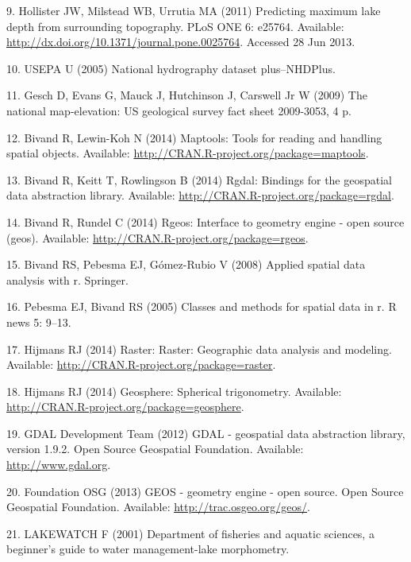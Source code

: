 \documentclass[11pt,]{article}
\begin{document}
\hypertarget{ref-hollister2011predicting}{}
9. Hollister JW, Milstead WB, Urrutia MA (2011) Predicting maximum lake
depth from surrounding topography. PLoS ONE 6: e25764. Available:
\url{http://dx.doi.org/10.1371/journal.pone.0025764}. Accessed 28 Jun
2013.

\hypertarget{ref-usepa2005national}{}
10. USEPA U (2005) National hydrography dataset plus--NHDPlus.

\hypertarget{ref-gesch2009national}{}
11. Gesch D, Evans G, Mauck J, Hutchinson J, Carswell Jr W (2009) The
national map-elevation: US geological survey fact sheet 2009-3053, 4 p.

\hypertarget{ref-bivand2014maptools}{}
12. Bivand R, Lewin-Koh N (2014) Maptools: Tools for reading and
handling spatial objects. Available:
\url{http://CRAN.R-project.org/package=maptools}.

\hypertarget{ref-bivand2014rgdal}{}
13. Bivand R, Keitt T, Rowlingson B (2014) Rgdal: Bindings for the
geospatial data abstraction library. Available:
\url{http://CRAN.R-project.org/package=rgdal}.

\hypertarget{ref-bivand2014rgeos}{}
14. Bivand R, Rundel C (2014) Rgeos: Interface to geometry engine - open
source (geos). Available: \url{http://CRAN.R-project.org/package=rgeos}.

\hypertarget{ref-bivand2008applied}{}
15. Bivand RS, Pebesma EJ, Gómez-Rubio V (2008) Applied spatial data
analysis with r. Springer.

\hypertarget{ref-pebesma2005sp}{}
16. Pebesma EJ, Bivand RS (2005) Classes and methods for spatial data in
r. R news 5: 9--13.

\hypertarget{ref-hijmans2014raster}{}
17. Hijmans RJ (2014) Raster: Raster: Geographic data analysis and
modeling. Available: \url{http://CRAN.R-project.org/package=raster}.

\hypertarget{ref-hijmans2014geosphere}{}
18. Hijmans RJ (2014) Geosphere: Spherical trigonometry. Available:
\url{http://CRAN.R-project.org/package=geosphere}.

\hypertarget{ref-GDAL2012}{}
19. GDAL Development Team (2012) GDAL - geospatial data abstraction
library, version 1.9.2. Open Source Geospatial Foundation. Available:
\href{\%20http://www.gdal.org}{http://www.gdal.org}.

\hypertarget{ref-GEOS2013}{}
20. Foundation OSG (2013) GEOS - geometry engine - open source. Open
Source Geospatial Foundation. Available:
\url{http://trac.osgeo.org/geos/}.

\hypertarget{ref-lakewatch2001department}{}
21. LAKEWATCH F (2001) Department of fisheries and aquatic sciences, a
beginner's guide to water management-lake morphometry.
\end{document}
